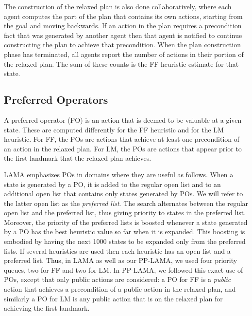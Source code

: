 \documentclass[letterpaper]{article}
\theoremstyle{definition}
\begin{document}
The construction of the relaxed plan is also done collaboratively, where each agent computes the part of the plan that contains its own actions, starting from the goal and moving backwards. If an action in the plan requires a precondition fact that was generated by another agent then that agent is notified to continue constructing the plan to achieve that precondition. When the plan construction phase has terminated, all agents report the number of actions in their portion of the relaxed plan. The sum of these counts is the FF heuristic estimate for that state.


\subsection{Preferred Operators}
\label{sec:preferredOperators}
A preferred operator (PO) is an action that is deemed to be valuable at a given state. These are computed differently for the FF heuristic and for the LM heuristic.  %
For FF, the POs are actions that achieve at least one precondition of an action in the relaxed plan. For LM, the POs are actions that appear prior to the first landmark that the relaxed plan achieves. 

LAMA emphasizes POs in domains where they are useful as follows. When a state is generated by a PO, it is added to the regular open list and to an additional open list that contains only states generated by POs. We will refer to the latter open list as the {\em preferred list}. The search alternates between the regular open list and the preferred list, thus giving priority to states in the preferred list. Moreover, the priority of the preferred lists is boosted whenever a state generated by a PO has the best heuristic value so far when it is expanded. This boosting is embodied by having the next 1000 states to be expanded only from the preferred lists. If several heuristics are used then each heuristic has an open list and a preferred list. Thus, in LAMA as well as our PP-LAMA, we used four priority queues, two for FF and two for LM. In PP-LAMA, we followed this exact use of POs, except that only public actions are considered: a PO for FF is a {\em public} action that achieves a precondition of a public action in the relaxed plan, and similarly a PO for LM is any public action that is on the relaxed plan for achieving the first landmark. %
\end{document}
